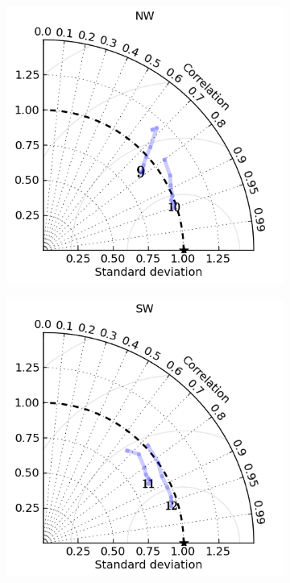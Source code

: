 \begin{figure}[H]
\begin{subfigure}{0.30\textwidth}
        \caption{}
    \end{subfigure}
    \begin{subfigure}{0.30\textwidth}
        \includegraphics[width=\textwidth]{figures/plots/taylor_diag_res_NW.png}
        \caption{}
    \end{subfigure}
  \begin{subfigure}{0.30\textwidth}
     \includegraphics[width=\textwidth]{figures/plots/taylor_diag_res_SW.png}

\end{subfigure}
\end{figure}
